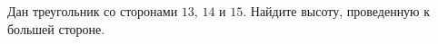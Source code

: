 \begin{ex}
	\begin{condition}
		Дан треугольник со сторонами \( 13 \), \( 14  \) и \( 15 \). Найдите высоту, проведенную к большей стороне.
	\end{condition}
\end{ex}